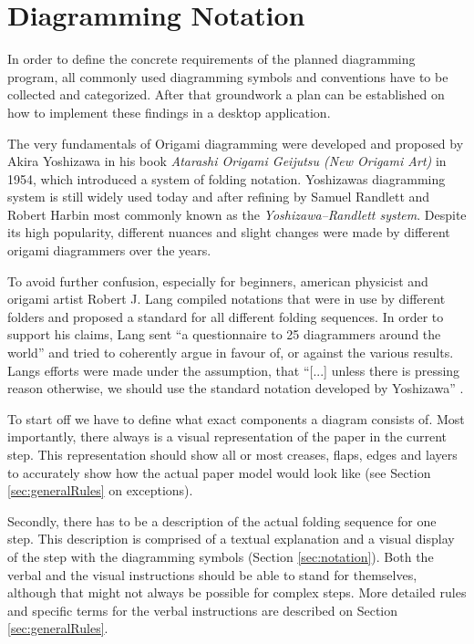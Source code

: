 
\section{Diagramming Notation}
\label{sec:conventions}

In order to define the concrete requirements of the planned diagramming program, all commonly used diagramming symbols and conventions have to be collected and categorized. After that groundwork a plan can be established on how to implement these findings in a desktop application.

The very fundamentals of Origami diagramming were developed and proposed by Akira Yoshizawa in his book \emph{Atarashi Origami Geijutsu (New Origami Art)}\cite{Yoshizawa} in 1954, which introduced a system of folding notation. Yoshizawas diagramming system is still widely used today and after refining by Samuel Randlett and Robert Harbin most commonly known as the \emph{Yoshizawa–Randlett system}. Despite its high popularity, different nuances and slight changes were made by different origami diagrammers over the years.

To avoid further confusion, especially for beginners, american physicist and origami artist Robert J. Lang compiled notations that were in use by different folders and proposed a standard for all different folding sequences. In order to support his claims, Lang sent \enquote{a questionnaire to 25 diagrammers around the world}\cite{Lang} and tried to coherently argue in favour of, or against the various results. Langs efforts were made under the assumption, that \enquote{[...] unless there is pressing reason otherwise, we should use the standard notation developed by Yoshizawa} \cite{Lang}.

To start off we have to define what exact components a diagram consists of. Most importantly, there always is a visual representation of the paper in the current step. This representation should show all or most creases, flaps, edges and layers to accurately show how the actual paper model would look like (see Section \ref{sec:generalRules} on exceptions).

Secondly, there has to be a description of the actual folding sequence for one step. This description is comprised of a textual explanation and a visual display of the step with the diagramming symbols (Section \ref{sec:notation}). Both the verbal and the visual instructions should be able to stand for themselves, although that might not always be possible for complex steps. More detailed rules and specific terms for the verbal instructions are described on Section \ref{sec:generalRules}.


